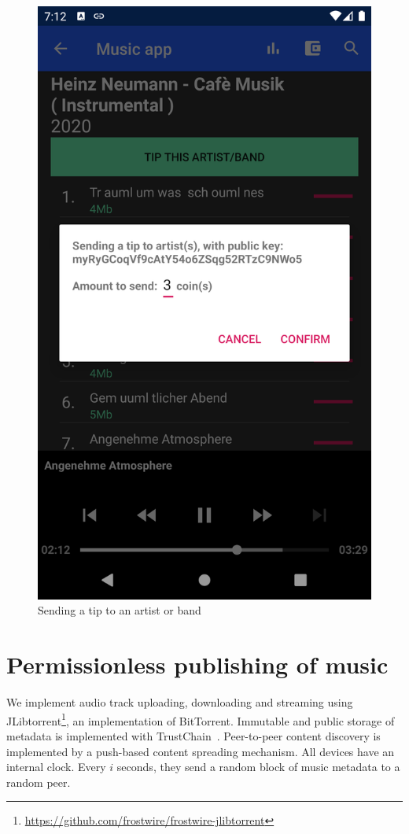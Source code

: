 \begin{figure}
        \includegraphics[width=1\linewidth]{implementation/send-tip.png}
        \caption{Sending a tip to an artist or band}
        \label{fig:tip-artist}
    \endminipage\hfill
\end{figure}

\section{Permissionless publishing of music}
We implement audio track uploading, downloading and streaming using JLibtorrent\footnote{\url{https://github.com/frostwire/frostwire-jlibtorrent}}, an implementation of BitTorrent. Immutable and public storage of metadata is implemented with TrustChain~\citep{otte2017trustchain}. 
\label{sec:torrent-creation}
Peer-to-peer content discovery is implemented by a push-based content spreading mechanism. All devices have an internal clock. Every $i$ seconds, they send a random block of music metadata to a random peer.

